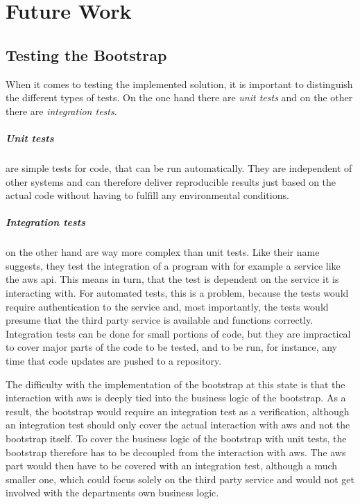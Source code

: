 \chapter{Future Work}
\section{Testing the Bootstrap}
When it comes to testing the implemented solution, it is important to distinguish the different types of tests.
On the one hand there are \emph{unit tests} and on the other there are \emph{integration tests}.

\paragraph{Unit tests} are simple tests for code, that can be run automatically.
They are independent of other systems and can therefore deliver reproducible results just based on the actual code without having to fulfill any environmental conditions.

\paragraph{Integration tests} on the other hand are way more complex than unit tests.
Like their name suggests, they test the integration of a program with for example a service like the \ac{aws} \ac{api}.
This means in turn, that the test is dependent on the service it is interacting with.
For automated tests, this is a problem, because the tests would require authentication to the service and, most importantly, the tests would presume that the third party service is available and functions correctly.
Integration tests can be done for small portions of code, but they are impractical to cover major parts of the code to be tested, and to be run, for instance, any time that code updates are pushed to a repository.

The difficulty with the implementation of the bootstrap at this state is that the interaction with \ac{aws} is deeply tied into the business logic of the bootstrap.
As a result, the bootstrap would require an integration test as a verification, although an integration test should only cover the actual interaction with \ac{aws} and not the bootstrap itself.
To cover the business logic of the bootstrap with unit tests, the bootstrap therefore has to be decoupled from the interaction with \ac{aws}.
The \ac{aws} part would then have to be covered with an integration test, although a much smaller one, which could focus solely on the third party service and would not get involved with the departments own business logic.

